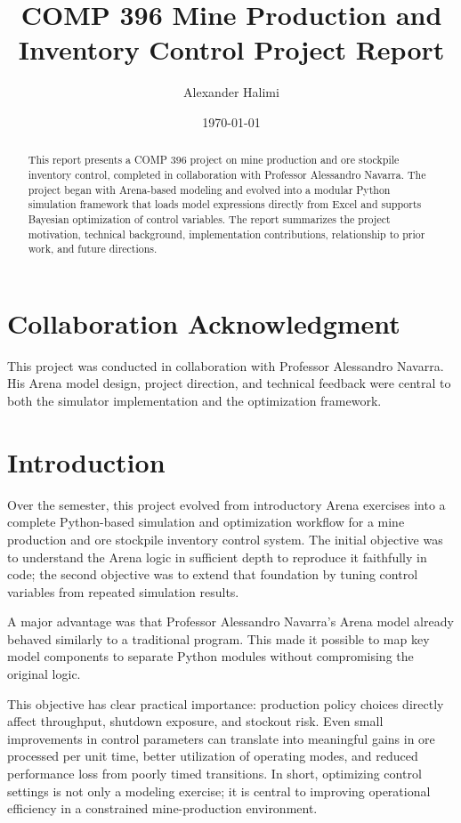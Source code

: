 \documentclass[11pt]{article}
\title{COMP 396 Mine Production and Inventory Control Project Report}
\author{Alexander Halimi}
\date{\today}
\begin{document}
\maketitle

\begin{abstract}
This report presents a COMP 396 project on mine production and ore stockpile inventory control, completed in collaboration with Professor Alessandro Navarra. The project began with Arena-based modeling and evolved into a modular Python simulation framework that loads model expressions directly from Excel and supports Bayesian optimization of control variables. The report summarizes the project motivation, technical background, implementation contributions, relationship to prior work, and future directions.
\end{abstract}

\section*{Collaboration Acknowledgment}
This project was conducted in collaboration with Professor Alessandro Navarra. His Arena model design, project direction, and technical feedback were central to both the simulator implementation and the optimization framework.

\section{Introduction}
Over the semester, this project evolved from introductory Arena exercises into a complete Python-based simulation and optimization workflow for a mine production and ore stockpile inventory control system. The initial objective was to understand the Arena logic in sufficient depth to reproduce it faithfully in code; the second objective was to extend that foundation by tuning control variables from repeated simulation results.

A major advantage was that Professor Alessandro Navarra's Arena model already behaved similarly to a traditional program. This made it possible to map key model components to separate Python modules without compromising the original logic.

This objective has clear practical importance: production policy choices directly affect throughput, shutdown exposure, and stockout risk. Even small improvements in control parameters can translate into meaningful gains in ore processed per unit time, better utilization of operating modes, and reduced performance loss from poorly timed transitions. In short, optimizing control settings is not only a modeling exercise; it is central to improving operational efficiency in a constrained mine-production environment.
\end{document}
